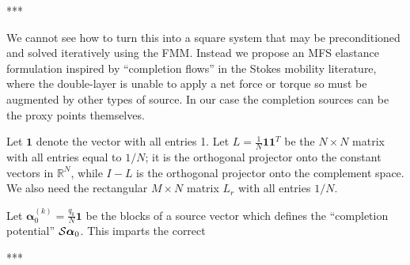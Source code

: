 \documentclass[10pt]{article}
\newcommand{\mbf}[1]{{\mathbf #1}}
\newcommand{\R}{\mathbb{R}}
\newcommand{\bal}{\bm{\alpha}}
\newcommand{\ok}{^{(k)}}
\begin{document}
*** 


  We cannot see how to turn this into a square system that
  may be preconditioned and solved iteratively using the FMM.
  Instead we propose an MFS elastance formulation
  inspired by ``completion flows'' in the Stokes mobility
  literature, where the double-layer is unable to apply a net force
  or torque so must be augmented by other types of source.
  In our case the completion sources can be the proxy points
  themselves.
  
Let $\mbf{1}$ denote the vector with all entries 1.
Let $L = \frac{1}{N}\mbf{1}\mbf{1}^T$ be the $N\times N$ matrix
with all entries equal to $1/N$; it is the orthogonal projector
onto the constant vectors in $\R^N$,
while $I-L$ is the orthogonal projector onto the complement space.
We also need the rectangular $M\times N$ matrix
$L_r$ with all entries $1/N$.

Let $\bal_0\ok = \frac{q_k}{N}\mbf{1}$ be the blocks of a source
vector which defines the
``completion potential'' ${\cal S}\bal_0$.
This imparts the correct

***





\end{document}
